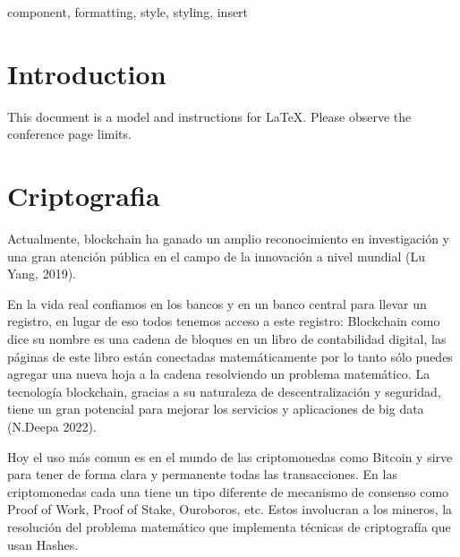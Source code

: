 \documentclass[conference]{IEEEtran}
\begin{document}
\begin{IEEEkeywords}
component, formatting, style, styling, insert
\end{IEEEkeywords}

\section{Introduction}
This document is a model and instructions for \LaTeX.
Please observe the conference page limits. 

\section{Criptografia}

Actualmente, blockchain ha ganado un amplio reconocimiento en investigación y una
gran atención pública en el campo de la innovación a nivel mundial (Lu Yang, 2019).

En la vida real confiamos en los bancos y en un banco central para llevar un registro, 
en lugar de eso todos tenemos acceso a este registro: Blockchain como dice su nombre es 
una cadena de bloques en un libro de contabilidad digital, las páginas de este libro están 
conectadas matemáticamente por lo tanto sólo puedes agregar una nueva hoja a la cadena 
resolviendo un problema matemático. La tecnología blockchain, gracias a su naturaleza de 
descentralización y seguridad, tiene un gran potencial para mejorar los servicios y aplicaciones de big data (N.Deepa 2022). 

Hoy el uso más comun es en el mundo de las criptomonedas como Bitcoin y sirve para tener de forma clara y permanente 
todas las transacciones. En las criptomonedas cada una tiene un tipo diferente de mecanismo de 
consenso como Proof of Work, Proof of Stake, Ouroboros, etc. Estos involucran a los mineros, 
la resolución del problema matemático que implementa técnicas de criptografía que usan Hashes.
\end{document}
